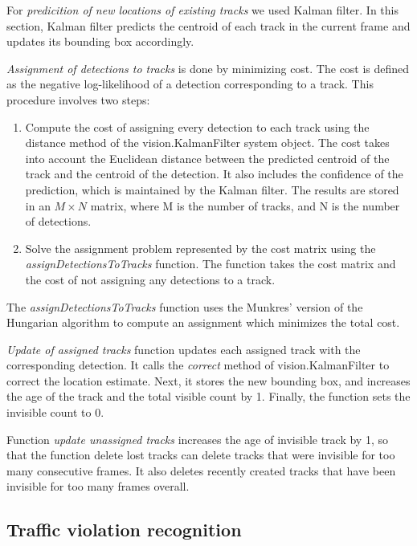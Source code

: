 \documentclass[12pt]{article} %
\begin{document}
For \textit{predicition of new locations of existing tracks} we used Kalman filter. In this section, Kalman filter predicts the centroid of each track in the current frame and updates its bounding box accordingly. 

\textit{Assignment of detections to tracks} is done by minimizing cost. The cost is defined as the negative log-likelihood of a detection corresponding to a track. This procedure involves two steps:
\begin{enumerate}
\item Compute the cost of assigning every detection to each track using the distance method of the vision.KalmanFilter system object. The cost takes into account the Euclidean distance between the predicted centroid of the track and the centroid of the detection. It also includes the confidence of the prediction, which is maintained by the Kalman filter. The results are stored in an $M\times N$ matrix, where M is the number of tracks, and N is the number of detections.

\item Solve the assignment problem represented by the cost matrix using the \textit{assignDetectionsToTracks} function. The function takes the cost matrix and the cost of not assigning any detections to a track.
\end{enumerate}


The \textit{assignDetectionsToTracks} function uses the Munkres' version of the Hungarian algorithm to compute an assignment which minimizes the total cost.

\textit{Update of assigned tracks} function updates each assigned track with the corresponding detection. It calls the \textit{correct} method of vision.KalmanFilter to correct the location estimate. Next, it stores the new bounding box, and increases the age of the track and the total visible count by 1. Finally, the function sets the invisible count to 0.

Function \textit{update unassigned tracks} increases the age of invisible track by 1, so that the function {delete lost tracks} can delete tracks that were invisible for too many consecutive frames. It also deletes recently created tracks that have been invisible for too many frames overall.

\subsection{Traffic violation recognition}

\end{document}
